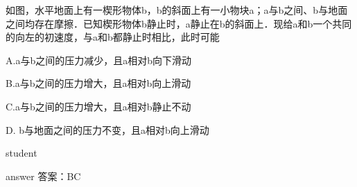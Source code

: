 \begin{example}
	如图，水平地面上有一楔形物体b，b的斜面上有一小物块a；a与b之间、b与地面之间均存在摩擦．已知楔形物体b静止时，a静止在b的斜面上．现给a和b一个共同的向左的初速度，与a和b都静止时相比，此时可能
	
	A.a与b之间的压力减少，且a相对b向下滑动
	
	B.a与b之间的压力增大，且a相对b向上滑动
	
	C.a与b之间的压力增大，且a相对b静止不动
	
	D.  b与地面之间的压力不变，且a相对b向上滑动
	
	
	\begin{taggedblock}{student}
		\vspace*{2cm}
	\end{taggedblock}
	
	
	\begin{taggedblock}{answer}
		答案：BC
	\end{taggedblock}
	

\end{example}
